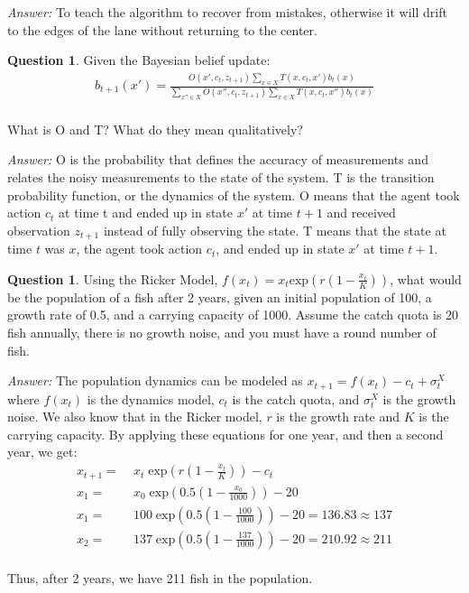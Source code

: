 \documentclass{article}
\theoremstyle{definition}
\newtheorem{question}[thm]{Question}
\newenvironment{answer}{\noindent\textit{Answer:}}{}
\begin{document}
\begin{answer}
To teach the algorithm to recover from mistakes, otherwise it will drift to the edges of the lane without returning to the center.
\end{answer}

\begin{question}
    Given the Bayesian belief update:
\\ \begin{equation*} \begin{aligned} 
b_{t+1}(x') = \frac{O(x', c_t, z_{t+1}) \sum_{x\in X}T(x,c_t,x')b_t(x)}{\sum_{x''\in X}O(x'',c_t,z_{t+1})\sum_{x\in X}T(x,c_t,x'')b_t(x)}
\end{aligned} \end{equation*} 
\\ What is O and T? What do they mean qualitatively?
\end{question}

\begin{answer}
O is the probability that defines the accuracy of measurements and relates the noisy measurements to the state of the system. T is the transition probability function, or the dynamics of the system. O means that the agent took action $c_t$ at time t and ended up in state $x'$ at time $t+1$ and received observation $z_{t+1}$ instead of fully observing the state. T means that the state at time $t$ was $x$, the agent took action $c_t$, and ended up in state $x'$ at time $t+1$. 
\end{answer}

\begin{question}
Using the Ricker Model, $f(x_t) = x_t \text{exp}(r(1-\frac{x_t}{K}))$, what would be the population of a fish after 2 years, given an initial population of 100, a growth rate of 0.5, and a carrying capacity of 1000. Assume the catch quota is 20 fish annually, there is no growth noise, and you must have a round number of fish.
\end{question}

\begin{answer}
    The population dynamics can be modeled as $x_{t+1} = f(x_t) - c_t + \sigma_t^X$ where $f(x_t)$ is the dynamics model, $c_t$ is the catch quota, and $\sigma_t^X$ is the growth noise. We also know that in the Ricker model, $r$ is the growth rate and $K$ is the carrying capacity. By applying these equations for one year, and then a second year, we get:
\\ \begin{equation*} \begin{aligned}
x_{t+1} =&\; x_t \;\text{exp}(r(1 - \frac{x_t}{K})) - c_t
\\ x_1 =&\; x_0 \;\text{exp}(0.5(1 - \frac{x_0}{1000})) - 20
\\ x_1 =&\; 100  \;\text{exp}(0.5(1 - \frac{100}{1000})) - 20 = 136.83 \approx 137
\\ x_2 =&\; 137 \;\text{exp}(0.5(1 - \frac{137}{1000})) - 20 = 210.92 \approx 211
\end{aligned} \end{equation*}
\\ Thus, after 2 years, we have 211 fish in the population.
\end{answer}
\end{document}
